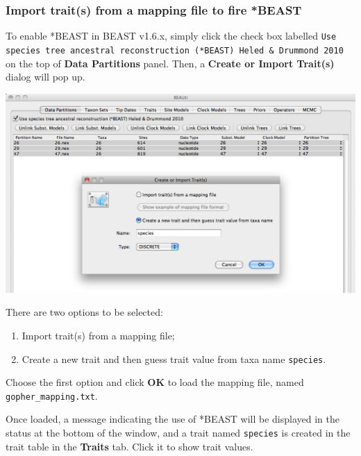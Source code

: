 \documentclass[12pt]{article}
\begin{document}
\medskip{}

\subsubsection*{Import trait(s) from a mapping file to fire *BEAST}

To enable *BEAST in BEAST v1.6.x, simply click the check box labelled \texttt{Use species tree ancestral reconstruction (*BEAST) Heled \& Drummond 2010} on the top of {\bf Data Partitions} panel. Then, a {\bf Create or Import Trait(s)} dialog will pop up.   

\medskip{}

\includegraphics[scale=0.4]{figures/BEAUti_CreateImportTrait}

\medskip{}

There are two options to be selected: 
\begin{enumerate}
  \item Import trait(s) from a mapping file; 
  \item Create a new trait and then guess trait value from taxa name \texttt{species}.  
\end{enumerate}

Choose the first option and click \textbf{OK} to load the mapping file, named\\ \texttt{gopher\_mapping.txt}. 

Once loaded, a message indicating the use of *BEAST will be displayed in the status at the bottom of the window, and a trait named \texttt{species} is created in the trait table in the {\bf Traits} tab. Click it to show trait values. 

\medskip{}
\end{document}
